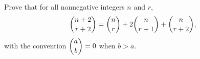 Prove that for all nonnegative integers $n$ and $r$,
\[
\dbinom{n+2}{r+2}=\dbinom nr+2\dbinom{n}{r+1}+\dbinom{n}{r+2},
\]
with the convention $\dbinom ab=0$ when $b>a$.
